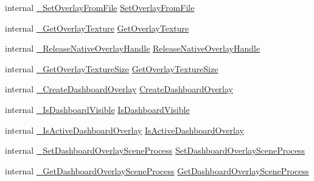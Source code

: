 \begin{DoxyCompactItemize}
\item 
internal \mbox{\hyperlink{struct_valve_1_1_v_r_1_1_i_v_r_overlay_a7651c5d114e08eb5cd7813524caf5220}{\+\_\+\+Set\+Overlay\+From\+File}} \mbox{\hyperlink{struct_valve_1_1_v_r_1_1_i_v_r_overlay_ae7566f3ff52167f0d3e2a88b2de1c4d0}{Set\+Overlay\+From\+File}}
\item 
internal \mbox{\hyperlink{struct_valve_1_1_v_r_1_1_i_v_r_overlay_a4736d358cfb1631b67f42d25c9850da3}{\+\_\+\+Get\+Overlay\+Texture}} \mbox{\hyperlink{struct_valve_1_1_v_r_1_1_i_v_r_overlay_a5f92b4b43e2fe9bf42f8cf4a1c4a2481}{Get\+Overlay\+Texture}}
\item 
internal \mbox{\hyperlink{struct_valve_1_1_v_r_1_1_i_v_r_overlay_a688ff280dfb7e1797a832b5e26ae7dc2}{\+\_\+\+Release\+Native\+Overlay\+Handle}} \mbox{\hyperlink{struct_valve_1_1_v_r_1_1_i_v_r_overlay_ab65e5ce74ba85d1476b32bd98c08ccbc}{Release\+Native\+Overlay\+Handle}}
\item 
internal \mbox{\hyperlink{struct_valve_1_1_v_r_1_1_i_v_r_overlay_af3140dc6e2be438f6c5989c7e49f5408}{\+\_\+\+Get\+Overlay\+Texture\+Size}} \mbox{\hyperlink{struct_valve_1_1_v_r_1_1_i_v_r_overlay_a642e14aa65ac3e802a3f9af985d089d7}{Get\+Overlay\+Texture\+Size}}
\item 
internal \mbox{\hyperlink{struct_valve_1_1_v_r_1_1_i_v_r_overlay_ad5cf0a30a2b92327fbcd10781baa7b2e}{\+\_\+\+Create\+Dashboard\+Overlay}} \mbox{\hyperlink{struct_valve_1_1_v_r_1_1_i_v_r_overlay_a9f874853fb39bf3ed675c27304384a03}{Create\+Dashboard\+Overlay}}
\item 
internal \mbox{\hyperlink{struct_valve_1_1_v_r_1_1_i_v_r_overlay_ae7389cf53d82e68927097e901093c534}{\+\_\+\+Is\+Dashboard\+Visible}} \mbox{\hyperlink{struct_valve_1_1_v_r_1_1_i_v_r_overlay_a9e719d337e065a94b31e56049f503901}{Is\+Dashboard\+Visible}}
\item 
internal \mbox{\hyperlink{struct_valve_1_1_v_r_1_1_i_v_r_overlay_a243e44cc1a50df0d00c3fd8f681ab050}{\+\_\+\+Is\+Active\+Dashboard\+Overlay}} \mbox{\hyperlink{struct_valve_1_1_v_r_1_1_i_v_r_overlay_a7038a35d661d68a89fc0899c6a23ea45}{Is\+Active\+Dashboard\+Overlay}}
\item 
internal \mbox{\hyperlink{struct_valve_1_1_v_r_1_1_i_v_r_overlay_ad5f215941b5872353dd95bf1b24fad09}{\+\_\+\+Set\+Dashboard\+Overlay\+Scene\+Process}} \mbox{\hyperlink{struct_valve_1_1_v_r_1_1_i_v_r_overlay_a684f451ae8b526493da2dba3c474dc59}{Set\+Dashboard\+Overlay\+Scene\+Process}}
\item 
internal \mbox{\hyperlink{struct_valve_1_1_v_r_1_1_i_v_r_overlay_ac3f0a30c6da88a835a1649b4eee9f314}{\+\_\+\+Get\+Dashboard\+Overlay\+Scene\+Process}} \mbox{\hyperlink{struct_valve_1_1_v_r_1_1_i_v_r_overlay_a088b895f92c6250d2e9ed920aff74d12}{Get\+Dashboard\+Overlay\+Scene\+Process}}

\end{DoxyCompactItemize}
